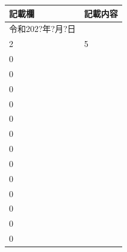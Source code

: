 \documentclass[UTF8,10pt,a4paper,fontset=fandol]{ctexart}
\newcommand{\fieldvalue}[1]{#1}
\newcommand{\handwritten}[1]{#1}
\begin{document}
\begin{tabularx}{\textwidth}{|p{}|X|}
\hline
\textbf{記載欄} & \textbf{記載内容} \\
\hline
\fieldvalue{\handwritten{令和202?年?月?日}} &
\\
\hline
\fieldvalue{\handwritten{2}} &
\fieldvalue{\handwritten{5}} \\
\hline
\fieldvalue{\handwritten{0}} &
\\
\hline
\fieldvalue{\handwritten{0}} &
\\
\hline
\fieldvalue{\handwritten{0}} &
\\
\hline
\fieldvalue{\handwritten{0}} &
\\
\hline
\fieldvalue{\handwritten{0}} &
\\
\hline
\fieldvalue{\handwritten{0}} &
\\
\hline
\fieldvalue{\handwritten{0}} &
\\
\hline
\fieldvalue{\handwritten{0}} &
\\
\hline
\fieldvalue{\handwritten{0}} &
\\
\hline
\fieldvalue{\handwritten{0}} &
\\
\hline
\fieldvalue{\handwritten{0}} &
\\
\hline
\fieldvalue{\handwritten{0}} &
\\
\hline
\fieldvalue{\handwritten{0}} &
\\
\hline

\end{tabularx}
\end{document}
